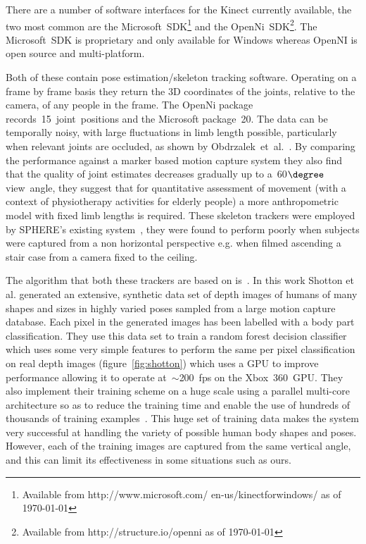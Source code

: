 \documentclass[11pt]{article} %
\begin{document}
There are a number of software interfaces for the Kinect currently available, the two most common are the Microsoft~SDK\footnote{Available from http://www.microsoft.com/ en-us/kinectforwindows/ as of \today} and the OpenNi~SDK\footnote{Available from http://structure.io/openni as of \today}. The Microsoft~SDK is proprietary and only available for Windows whereas OpenNI is open source and multi-platform. 

Both of these contain pose estimation/skeleton tracking software. Operating on a frame by frame basis they return the 3D coordinates of the joints, relative to the camera, of any people in the frame. The OpenNi package records~15~joint~positions and the Microsoft package~20. The data can be temporally noisy, with large fluctuations in limb length possible, particularly when relevant joints are occluded, as shown by Obdrzalek~et~al.~\cite{Obdrzalek2012}. By comparing the performance against a marker based motion capture system they also find that the quality of joint estimates decreases gradually up to a~60$\degree$ view~angle, they suggest that for quantitative assessment of movement (with a context of physiotherapy activities for elderly people) a more anthropometric model with fixed limb lengths is required. These skeleton trackers were employed by SPHERE's existing system~\cite{Paiement}, they were found to perform poorly when subjects were captured from a non horizontal perspective e.g. when filmed ascending a stair case from a camera fixed to the ceiling.

The algorithm that both these trackers are based on is~\cite{Blake2011}. In this work Shotton et al. generated an extensive, synthetic data set of depth images of humans of many shapes and sizes in highly varied poses sampled from a large motion capture database. Each pixel in the generated images has been labelled with a body part classification. They use this data set to train a random forest decision classifier which uses some very simple features to perform the same per pixel classification on real depth images (figure~\ref{fig:shotton}) which uses a GPU to improve performance allowing it to operate at~$\sim$200~fps on the Xbox~360~GPU. They also implement their training scheme on a huge scale using a parallel multi-core architecture so as to reduce the training time and enable the use of hundreds of thousands of training examples~\cite{Budiu2011}. This huge set of training data makes the system very successful at handling the variety of possible human body shapes and poses. However, each of the training images are captured from the same vertical angle, and this can limit its effectiveness in some situations such as ours. %
\end{document}
